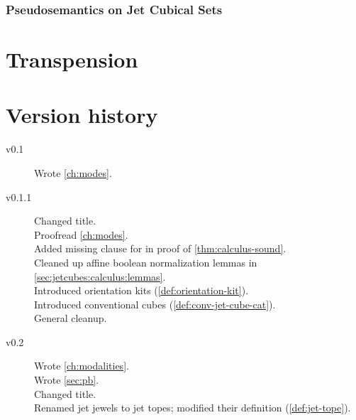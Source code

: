\documentclass[a4paper]{memoir}
\begin{document}
\subsection{Pseudosemantics on Jet Cubical Sets} \label{sec:poresh-jcset:pseudo}

\chapter{Transpension}

\appendix
\chapter{Version history}
\begin{description}
	\item[v0.1] Wrote \cref{ch:modes}.
	\item[v0.1.1] Changed title. \\
		Proofread \cref{ch:modes}. \\
		Added missing clause for  in proof of \cref{thm:calculus-sound}. \\
		Cleaned up affine boolean normalization lemmas in \cref{sec:jetcubes:calculus:lemmas}. \\
		Introduced orientation kits (\cref{def:orientation-kit}). \\
		Introduced conventional cubes (\cref{def:conv-jet-cube-cat}). \\
		General cleanup.
	\item[v0.2] Wrote \cref{ch:modalities}. \\
		Wrote \cref{sec:pb}. \\
		Changed title. \\
		Renamed jet jewels to jet topes; modified their definition (\cref{def:jet-tope}).
\end{description}



\end{document}
